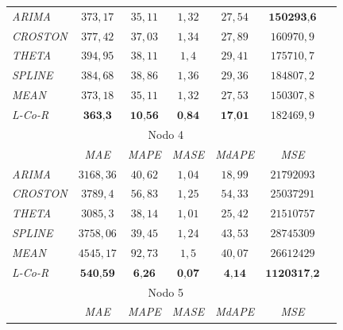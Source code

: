 \documentclass[runningheads]{llncs}
\begin{document}
\begin{table}
\begin{center}
\begin{tabular}{|l|c|c|c|c|c|c|}
\emph{ARIMA } & $373,17$ & $35,11$ & $1,32$ & $27,54$ & $\textbf{150293,6}$ \\%
\emph{CROSTON } & $377,42$ & $37,03$ & $1,34$ & $27,89$ & $160970,9$ \\%
\emph{THETA } & $394,95$ & $38,11$ & $1,4$ & $29,41$ & $175710,7$ \\%
\emph{SPLINE } & $384,68$ & $38,86$ & $1,36$ & $29,36$ & $184807,2$ \\%
\emph{MEAN } & $373,18$ & $35,11$ & $1,32$ & $27,53$ & $150307,8$ \\%
\emph{L-Co-R} & $\textbf{363,3}$ & $\textbf{10,56}$ & $\textbf{0,84}$ & $\textbf{17,01}$ &
$182469,9$ \\%
\hline 
 \multicolumn{6}{|c|}{Nodo 4} \\ 
 \hline 
 & \emph{MAE} & \emph{MAPE} & \emph{MASE} & \emph{MdAPE} & \emph{MSE} \\%
\hline

\emph{ARIMA } & $3168,36$ & $40,62$ & $1,04$ & $18,99$ & $21792093$ \\%
\emph{CROSTON } & $3789,4$ & $56,83$ & $1,25$ & $54,33$ & $25037291$ \\%
\emph{THETA } & $3085,3$ & $38,14$ & $1,01$ & $25,42$ & $21510757$ \\%
\emph{SPLINE } & $3758,06$ & $39,45$ & $1,24$ & $43,53$ & $28745309$ \\%
\emph{MEAN } & $4545,17$ & $92,73$ & $1,5$ & $40,07$ & $26612429$ \\%
\emph{L-Co-R} & $\textbf{540,59}$ & $\textbf{6,26}$ & $\textbf{0,07}$ & $\textbf{4,14}$ &
$\textbf{1120317,2}$ \\%
\hline 
 \multicolumn{6}{|c|}{Nodo 5} \\ 
 \hline 
 & \emph{MAE} & \emph{MAPE} & \emph{MASE} & \emph{MdAPE} & \emph{MSE} \\%
\hline


\end{tabular}
\end{center}
\end{table}
\end{document}
